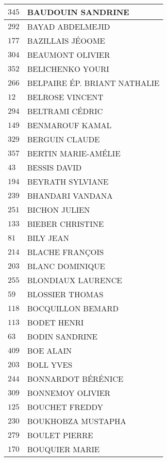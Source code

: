 \begin{xltabular}{\linewidth}{|l|X|}
    \hline
    $345$ & BAUDOUIN SANDRINE \\
    \hline
    $292$ & BAYAD ABDELMEJID \\
    \hline
    $177$ & BAZILLAIS JÉOOME \\
    \hline
    $304$ & BEAUMONT OLIVIER \\
    \hline
    $352$ & BELICHENKO YOURI \\
    \hline
    $266$ & BELPAIRE ÉP. BRIANT NATHALIE \\
    \hline
    $12$ & BELROSE VINCENT \\
    \hline
    $294$ & BELTRAMI CÉDRIC \\
    \hline
    $149$ & BENMAROUF KAMAL \\
    \hline
    $329$ & BERGUIN CLAUDE \\
    \hline
    $357$ & BERTIN MARIE-AMÉLIE \\
    \hline
    $43$ & BESSIS DAVID \\
    \hline
    $194$ & BEYRATH SYLVIANE \\
    \hline
    $239$ & BHANDARI VANDANA \\
    \hline
    $251$ & BICHON JULIEN \\
    \hline
    $133$ & BIEBER CHRISTINE \\
    \hline
    $81$ & BILY JEAN \\
    \hline
    $214$ & BLACHE FRANÇOIS \\
    \hline
    $203$ & BLANC DOMINIQUE \\
    \hline
    $255$ & BLONDIAUX LAURENCE \\
    \hline
    $59$ & BLOSSIER THOMAS \\
    \hline
    $118$ & BOCQUILLON BEMARD \\
    \hline
    $113$ & BODET HENRI \\
    \hline
    $63$ & BODIN SANDRINE \\
    \hline
    $409$ & BOE ALAIN \\
    \hline
    $203$ & BOLL YVES \\
    \hline
    $244$ & BONNARDOT BÉRÉNICE \\
    \hline
    $309$ & BONNEMOY OLIVIER \\
    \hline
    $125$ & BOUCHET FREDDY \\
    \hline
    $230$ & BOUKHOBZA MUSTAPHA \\
    \hline
    $279$ & BOULET PIERRE \\
    \hline
    $170$ & BOUQUIER MARIE \\

\end{xltabular}
